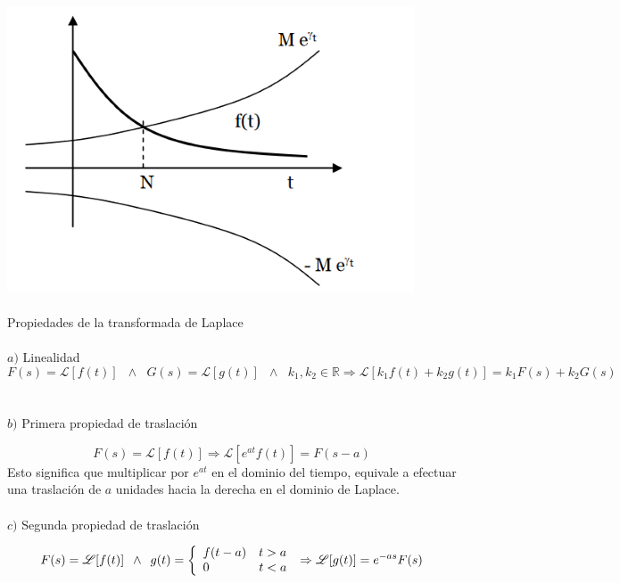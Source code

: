\documentclass[]{article}
\begin{document}
\includegraphics{../../../Imagenes/Superior/TransformadaDeLaplace/Laplace01.PNG}
\\
\\
\Large Propiedades de la transformada de Laplace
\normalsize
\\
\\
$a)$ Linealidad
$$
F(s) = \mathscr{L}[f(t)]\hspace{7pt} \wedge\hspace{7pt} G(s) = \mathscr{L}[g(t)]\hspace{7pt} \wedge\hspace{7pt} k_{1} , k_{2} \in \mathbb{R} \Rightarrow \mathscr{L}[k_{1}f(t) + k_{2}g(t)] = k_{1} F(s) + k_{2} G(s)
$$
\\
\\
$b)$ Primera propiedad de traslación

$$
F(s) = \mathscr{L}[f(t)] \Rightarrow \mathscr{L}[e^{at}f(t)] = F(s-a)
$$
Esto significa que multiplicar por $e^{at}$ en el dominio del tiempo, equivale a efectuar una traslación de $a$ unidades hacia la derecha en el dominio de Laplace.
\\
\\
$c)$ Segunda propiedad de traslación

$$
F(s) = \mathscr{L}[f(t)] \hspace{5pt} \wedge \hspace{5pt} g(t) = \left\{
	\begin{array}{ll}
		f(t-a) \hspace{10pt} t > a \\
		0 \hspace{40pt} t < a
	\end{array}
\right. \\
\Rightarrow \mathscr{L}[g(t)] = e^{-as}F(s)
$$
\end{document}
